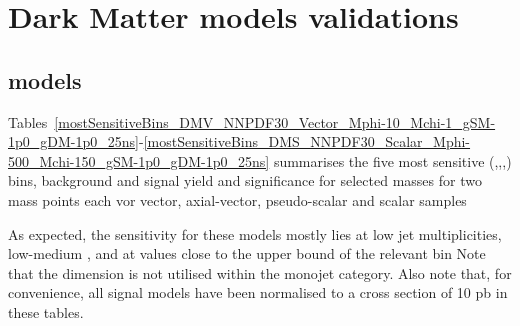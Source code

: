 \section{Dark Matter models validations}
\label{sec:dm_checklist}

\subsection{\DMj models}

Tables~\ref{mostSensitiveBins_DMV_NNPDF30_Vector_Mphi-10_Mchi-1_gSM-1p0_gDM-1p0_25ns}-\ref{mostSensitiveBins_DMS_NNPDF30_Scalar_Mphi-500_Mchi-150_gSM-1p0_gDM-1p0_25ns} summarises the five most sensitive (\njet,\nb,\scalht,\mht) bins, background and signal yield and significance for selected \DMbb masses for two mass points each vor vector, axial-vector, pseudo-scalar and scalar samples

As expected, the sensitivity for these models mostly lies at low jet
multiplicities, low-medium \scalht, and at \mht values close to the upper bound
of the relevant \scalht bin Note that the \mht dimension is not utilised within 
the monojet category. Also note that, for convenience, all signal models have 
been normalised to a cross section of 10 pb in these tables.




\\
\\

\\
\\

\\
\\

\\
\\




